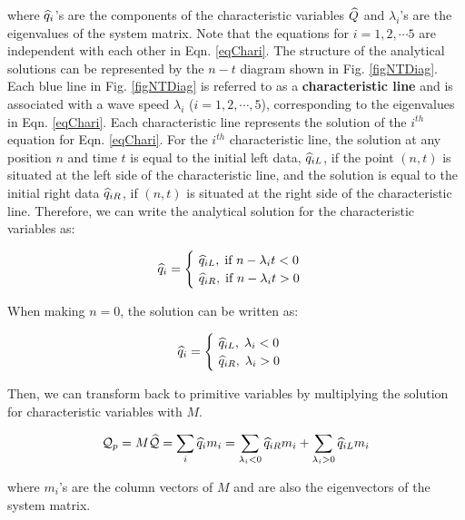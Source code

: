 \documentclass[12pt, letterpaper]{report}
\begin{document}
where $\widehat{q}_i$'s are the components of the characteristic variables $\widehat{Q}$ and $\lambda_i$'s are the
eigenvalues of the system matrix. Note that the equations for $i = 1, 2, \cdots 5$ are independent
with each other in Eqn. \ref{eqChari}. The structure of the analytical solutions can be represented
by the $n-t$ diagram shown in Fig. \ref{figNTDiag}. Each blue line in Fig. \ref{figNTDiag} is
referred to as a {\bf characteristic line} and is associated with a wave speed $\lambda_i$ ($i =
1, 2, \cdots, 5$), corresponding to the eigenvalues in Eqn. \ref{eqChari}. Each characteristic line
represents the solution of the $i^{th}$ equation for Eqn. \ref{eqChari}. For the $i^{th}$
characteristic line, the solution at any position $n$ and time $t$ is equal to the initial left
data, $\widehat{q}_{iL}$, if the point $(n,t)$ is situated at the left side of the characteristic line, and
the solution is equal to the initial right data $\widehat{q}_{iR}$, if $(n,t)$ is situated at the right side
of the characteristic line. Therefore, we can write the analytical solution for the characteristic
variables as:

\begin{align*}
   \widehat{q}_i = \begin{cases}
      \ \widehat{q}_{iL}, \; \textrm{if } n - \lambda_i t < 0 \\
      \ \widehat{q}_{iR}, \; \textrm{if } n - \lambda_i t > 0
   \end{cases}
\end{align*}

When making $n = 0$, the solution can be written as:

\begin{align*}
   \widehat{q}_i = \begin{cases}
      \ \widehat{q}_{iL}, \; \lambda_i < 0 \\
      \ \widehat{q}_{iR}, \; \lambda_i > 0
   \end{cases}
\end{align*}

Then, we can transform back to primitive variables by multiplying the solution for characteristic
variables with $M$. 

\begin{align}\label{eqAnl1}
   \mathcal{Q}_p = M\widehat{\mathcal{Q}} = \sum_i \widehat{q}_i m_i = \sum_{\lambda_i < 0} \widehat{q}_{iR} m_i +
   \sum_{\lambda_i > 0} \widehat{q}_{iL} m_i
\end{align}

where $m_i$'s are the column vectors of $M$ and are also the eigenvectors of the system matrix.
\end{document}
